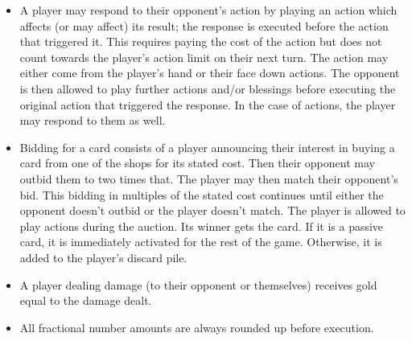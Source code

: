 \documentclass[dvipsnames,parskip,a4paper]{scrartcl}
\begin{document}
\begin{itemize}
\item

A player may respond to their opponent's action by playing an action which affects (or may affect) its result; the response is executed before the action that triggered it. This requires paying the cost of the action but does not count towards the player's action limit on their next turn. The action may either come from the player's hand or their face down actions. The opponent is then allowed to play further actions and/or blessings before executing the original action that triggered the response. In the case of actions, the player may respond to them as well.

\item

Bidding for a card consists of a player announcing their interest in buying a card from one of the shops for its stated cost. Then their opponent may outbid them to two times that. The player may then match their opponent's bid. This bidding in multiples of the stated cost continues until either the opponent doesn't outbid or the player doesn't match. The player is allowed to play actions during the auction. Its winner gets the card. If it is a passive card, it is immediately activated for the rest of the game. Otherwise, it is added to the player's discard pile.

\item

A player dealing damage (to their opponent or themselves) receives gold equal to the damage dealt.

\item

All fractional number amounts are always rounded up before execution.

\end{itemize}

\newpage
\end{document}
